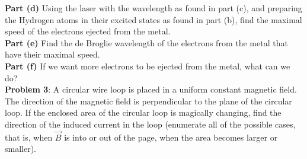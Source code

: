 \documentclass[11pt]{article}
\begin{document}
\noindent\textbf{Part (d)} Using the laser with the wavelength as found in part (c), and preparing the Hydrogen atoms in their excited states as found in part (b), find the maximal speed of the electrons ejected from the metal.\\

\noindent\textbf{Part (e)} Find the de Broglie wavelength of the electrons from the metal that have their maximal speed. \\

\noindent\textbf{Part (f)} If we want more electrons to be ejected from the metal, what can we do?\\

\newpage
\noindent\textbf{Problem 3}: A circular wire loop is placed in a uniform constant magnetic field. The direction of the magnetic field is perpendicular to the plane of the circular loop. If the enclosed area of the circular loop is magically changing, find the direction of the induced current in the loop (enumerate all of the possible cases, that is, when $\vec{B}$ is into or out of the page, when the area becomes larger or smaller). 
\end{document}

